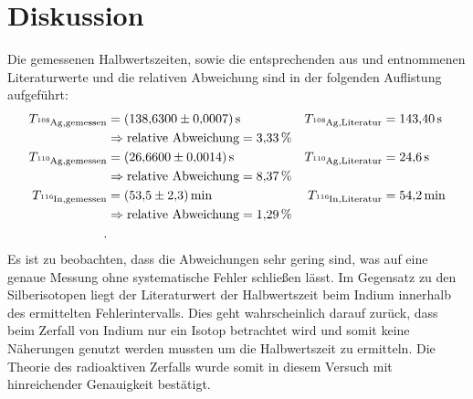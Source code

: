 \section{Diskussion}
\label{sec:Diskussion}
Die gemessenen Halbwertszeiten, sowie die entsprechenden aus \cite{Ag} und \cite{In} entnommenen Literaturwerte und
die relativen Abweichung sind in der folgenden Auflistung aufgeführt:
\begin{align*}
  T_{\ce{^{108}Ag},\text{gemessen}} &= \SI{138.63 \pm 0.0007}{\second} &   T_{\ce{^{108}Ag},\text{Literatur}} &= \SI{143.40}{\second} \\
  & \Rightarrow \text{relative Abweichung} = \SI{3.33}{\percent} \\
  T_{\ce{^{110}Ag},\text{gemessen}} &= \SI{26.66 \pm 0.0014}{\second}  &   T_{\ce{^{110}Ag},\text{Literatur}} &= \SI{24.6}{\second} \\
  & \Rightarrow \text{relative Abweichung} = \SI{8.37}{\percent} \\
  T_{\ce{^{116}In},\text{gemessen}} &= \SI{53.5 \pm 2.3}{\minute}  &   T_{\ce{^{116}In},\text{Literatur}} &= \SI{54.2}{\minute} \\
  & \Rightarrow \text{relative Abweichung} = \SI{1.29}{\percent} \\ .
\end{align*}
Es ist zu beobachten, dass die Abweichungen sehr gering sind, was auf eine genaue Messung ohne systematische Fehler schließen lässt.
Im Gegensatz zu den Silberisotopen liegt der Literaturwert der Halbwertszeit beim Indium innerhalb des ermittelten Fehlerintervalls.
Dies geht wahrscheinlich darauf zurück, dass beim Zerfall von Indium nur ein Isotop betrachtet wird und somit keine Näherungen genutzt
werden mussten um die Halbwertszeit zu ermitteln. 
Die Theorie des radioaktiven Zerfalls wurde somit in diesem Versuch mit hinreichender Genauigkeit bestätigt.
